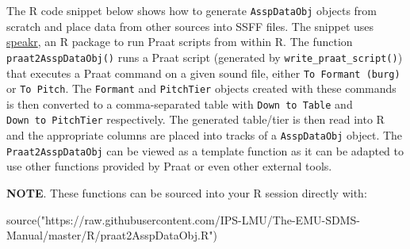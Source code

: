 \documentclass[
]{book}
\newenvironment{Shaded}{\begin{snugshade}}{\end{snugshade}}
\newcommand{\FunctionTok}[1]{\textcolor[rgb]{0.00,0.00,0.00}{#1}}
\newcommand{\NormalTok}[1]{#1}
\newcommand{\StringTok}[1]{\textcolor[rgb]{0.31,0.60,0.02}{#1}}
\begin{document}
The R code snippet below shows how to generate \texttt{AsspDataObj} objects from scratch and place data from other sources into SSFF files. The snippet uses \href{https://stefanocoretta.github.io/speakr/}{speakr}, an R package to run Praat scripts from within R. The function \texttt{praat2AsspDataObj()} runs a Praat script (generated by \texttt{write\_praat\_script()}) that executes a Praat command on a given sound file, either \texttt{To\ Formant\ (burg)} or \texttt{To\ Pitch}. The \texttt{Formant} and \texttt{PitchTier} objects created with these commands is then converted to a comma-separated table with \texttt{Down\ to\ Table} and \texttt{Down\ to\ PitchTier} respectively. The generated table/tier is then read into R and the appropriate columns are placed into tracks of a \texttt{AsspDataObj} object. The \texttt{Praat2AsspDataObj} can be viewed as a template function as it can be adapted to use other functions provided by Praat or even other external tools.

\textbf{NOTE}. These functions can be sourced into your R session directly with:

\begin{Shaded}
\begin{Highlighting}[]
\FunctionTok{source}\NormalTok{(}\StringTok{"https://raw.githubusercontent.com/IPS{-}LMU/The{-}EMU{-}SDMS{-}Manual/master/R/praat2AsspDataObj.R"}\NormalTok{)}
\end{Highlighting}
\end{Shaded}
\end{document}
